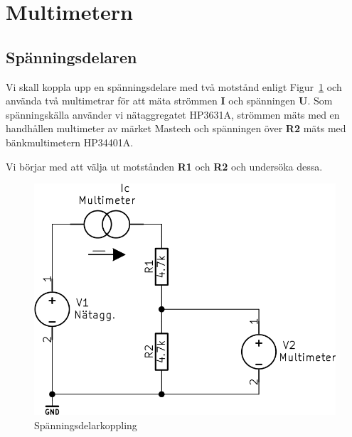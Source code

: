 \documentclass[11pt,a4paper]{article}
\begin{document}
\section{Multimetern}\label{}

\subsection{Spänningsdelaren}\label{vdiv1}
Vi skall koppla upp en spänningsdelare med två motstånd enligt 
Figur~\ref{fig:2-mm-schem} och använda två multimetrar för att mäta strömmen 
\textbf{I} och spänningen \textbf{U}. Som spänningskälla använder vi 
nätaggregatet HP3631A, strömmen mäts med en handhållen multimeter av märket
Mastech och spänningen över \textbf{R2} mäts med bänkmultimetern HP34401A.
\par Vi börjar med att välja ut motstånden \textbf{R1} och \textbf{R2} och 
undersöka dessa.

\begin{figure}[htbp]
    \centering
        \includegraphics[scale=0.5]{kicad/2-multimeter-schema.png}
    \caption{Spänningsdelarkoppling}
    \label{fig:2-mm-schem}
\end{figure}
\end{document}
